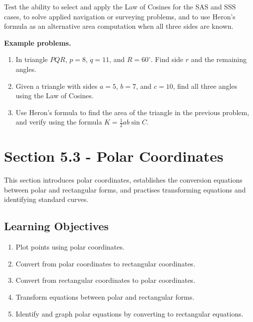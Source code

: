 Test the ability to select and apply the Law of Cosines for the SAS and SSS cases, to
solve applied navigation or surveying problems, and to use Heron's formula as an
alternative area computation when all three sides are known.

\textbf{Example problems.}
\begin{enumerate}
    \item In triangle $PQR$, $p = 8$, $q = 11$, and $R = 60^{\circ}$. Find side $r$ and the remaining angles.
    \item Given a triangle with sides $a = 5$, $b = 7$, and $c = 10$, find all three angles using the Law of Cosines.
    \item Use Heron's formula to find the area of the triangle in the previous problem, and verify using the formula $K = \frac{1}{2}ab\sin C$.
\end{enumerate}

\section{Section 5.3 - Polar Coordinates}
\label{sec:sect-1544}

This section introduces polar coordinates, establishes the conversion equations between
polar and rectangular forms, and practises transforming equations and identifying standard
curves.

\subsection{Learning Objectives}
\label{ssec:lear-fe6e}

\begin{enumerate}
    \item Plot points using polar coordinates.
    \item Convert from polar coordinates to rectangular coordinates.
    \item Convert from rectangular coordinates to polar coordinates.
    \item Transform equations between polar and rectangular forms.
    \item Identify and graph polar equations by converting to rectangular equations.
\end{enumerate}

